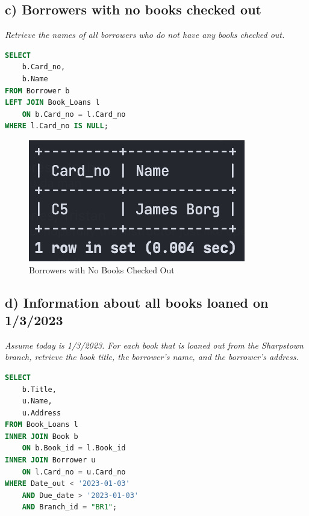 \documentclass{article}
\begin{document}
\subsection{c) Borrowers with no books checked out}

\textit{Retrieve the names of all borrowers who do not have any books checked out.}

\begin{lstlisting}[language=SQL,
    deletekeywords={IDENTITY},
    deletekeywords={[2]INT},
    morekeywords={clustered},
    framesep=8pt,
    xleftmargin=40pt,
    framexleftmargin=40pt,
    frame=tb,
    framerule=0pt ]
SELECT 
    b.Card_no,
    b.Name
FROM Borrower b
LEFT JOIN Book_Loans l
    ON b.Card_no = l.Card_no
WHERE l.Card_no IS NULL; 
\end{lstlisting}

\begin{figure}[!h]
    \centering
    \includegraphics[scale=0.6]{images/q4-c-results.png}
    \caption{Borrowers with No Books Checked Out}
    \label{fig:q4_c_borrowers}
\end{figure}

\newpage
\subsection{d) Information about all books loaned on 1/3/2023}

\textit{Assume today is 1/3/2023. For each book that is loaned out from the Sharpstown branch,
retrieve the book title, the borrower's name, and the borrower's address.}

\begin{lstlisting}[language=SQL,
    deletekeywords={IDENTITY},
    deletekeywords={[2]INT},
    morekeywords={clustered},
    framesep=8pt,
    xleftmargin=40pt,
    framexleftmargin=40pt,
    frame=tb,
    framerule=0pt ]
SELECT
    b.Title,
    u.Name,
    u.Address
FROM Book_Loans l
INNER JOIN Book b 
    ON b.Book_id = l.Book_id
INNER JOIN Borrower u
    ON l.Card_no = u.Card_no
WHERE Date_out < '2023-01-03'
    AND Due_date > '2023-01-03'
    AND Branch_id = "BR1"; 
\end{lstlisting}
\end{document}
